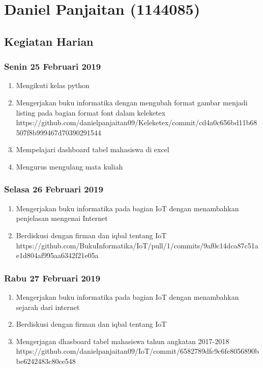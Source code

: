 \chapter{Daniel Panjaitan (1144085)}

\section{Kegiatan Harian}
\subsection{Senin 25 Februari 2019}
\begin{enumerate}
  \item Mengikuti kelas python
  \item Mengerjakan buku informatika dengan mengubah format gambar menjadi listing pada bagian format font dalam keleketex
  \subitem https://github.com/danielpanjaitan09/Keleketex/commit/cd4a0c656bd11b68507f8b999467d70390291544
  \item Mempelajari dashboard tabel mahasiswa di excel
  \item Mengurus mengulang mata kuliah
\end{enumerate}


\subsection{Selasa 26 Februari 2019}
\begin{enumerate}
  \item Mengerjakan buku informatika pada bagian IoT dengan menambahkan penjelasan mengenai Internet
  \item Berdiskusi dengan firman dan iqbal tentang IoT
  \subitem https://github.com/BukuInformatika/IoT/pull/1/commits/9af0c14dca87c51ae1d804af995aa6342f21e05a
\end{enumerate}

\subsection{Rabu 27 Februari 2019}
\begin{enumerate}
  \item Mengerjakan buku informatika pada bagian IoT dengan menambahkan sejarah dari internet
  \item Berdiskusi dengan firman dan iqbal tentang IoT
  \item Mengerjagan dhasboard tabel mahasiswa tahun angkatan 2017-2018
  \subitem https://github.com/danielpanjaitan09/IoT/commit/6582789dfc9c6fe8056890bbe6242483c80ce548
\end{enumerate} 

